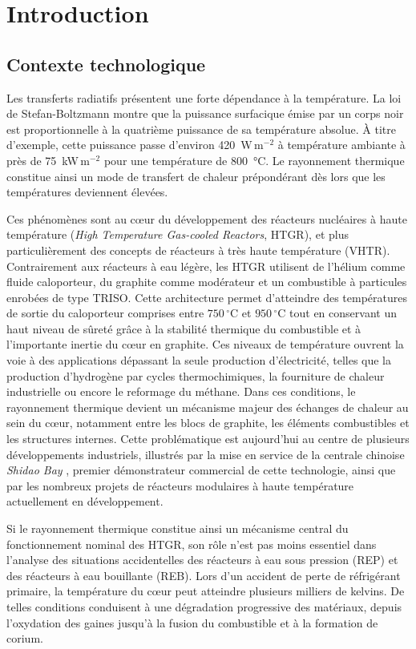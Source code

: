 \chapter{Introduction}
\section{Contexte technologique}

Les transferts radiatifs présentent une forte dépendance à la température. La loi de Stefan-Boltzmann montre que la puissance surfacique émise par un corps noir est proportionnelle à la quatrième puissance de sa température absolue. À titre d'exemple, cette puissance passe d'environ 420~W\,m$^{-2}$ à température ambiante à près de 75~kW\,m$^{-2}$ pour une température de 800~°C. Le rayonnement thermique constitue ainsi un mode de transfert de chaleur prépondérant dès lors que les températures deviennent élevées.

Ces phénomènes sont au cœur du développement des réacteurs nucléaires à haute température (\textit{High Temperature Gas-cooled Reactors}, HTGR), et plus particulièrement des concepts de réacteurs à très haute température (VHTR). Contrairement aux réacteurs à eau légère, les HTGR utilisent de l'hélium comme fluide caloporteur, du graphite comme modérateur et un combustible à particules enrobées de type TRISO. Cette architecture permet d'atteindre des températures de sortie du caloporteur comprises entre $750\,^{\circ}\mathrm{C}$ et $950\,^{\circ}\mathrm{C}$ tout en conservant un haut niveau de sûreté grâce à la stabilité thermique du combustible et à l'importante inertie du cœur en graphite. Ces niveaux de température ouvrent la voie à des applications dépassant la seule production d'électricité, telles que la production d'hydrogène par cycles thermochimiques, la fourniture de chaleur industrielle ou encore le reformage du méthane. Dans ces conditions, le rayonnement thermique devient un mécanisme majeur des échanges de chaleur au sein du cœur, notamment entre les blocs de graphite, les éléments combustibles et les structures internes. Cette problématique est aujourd'hui au centre de plusieurs développements industriels, illustrés par la mise en service de la centrale chinoise \textit{Shidao Bay} \cite{shidao}, premier démonstrateur commercial de cette technologie, ainsi que par les nombreux projets de réacteurs modulaires à haute température actuellement en développement.

Si le rayonnement thermique constitue ainsi un mécanisme central du fonctionnement nominal des HTGR, son rôle n'est pas moins essentiel dans l'analyse des situations accidentelles des réacteurs à eau sous pression (REP) et des réacteurs à eau bouillante (REB). Lors d'un accident de perte de réfrigérant primaire, la température du cœur peut atteindre plusieurs milliers de kelvins. De telles conditions conduisent à une dégradation progressive des matériaux, depuis l'oxydation des gaines jusqu'à la fusion du combustible et à la formation de corium.

